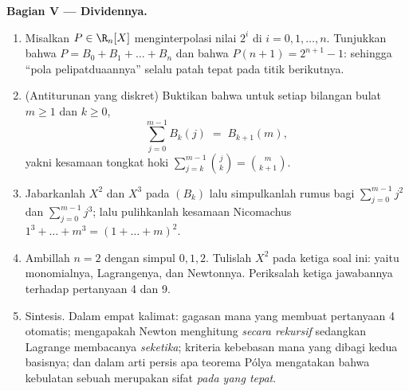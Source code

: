 \begin{problem}
\medskip
\noindent\textbf{Bagian V --- Dividennya.}
\begin{enumerate}[resume]
  \item Misalkan $P \in \R_n[X]$ menginterpolasi nilai $2^i$ di $i =
        0, 1, \dots, n$. Tunjukkan bahwa $P = B_0 + B_1 + \dots + B_n$
        dan bahwa $P(n + 1) = 2^{n+1} - 1$: sehingga ``pola
        pelipatduaannya'' selalu patah tepat pada titik berikutnya.
  \item (Antiturunan yang diskret) Buktikan bahwa untuk setiap bilangan bulat $m
        \geq 1$ dan $k \geq 0$,
        \[
        \sum_{j=0}^{m-1} B_k(j) \;=\; B_{k+1}(m),
        \]
        yakni kesamaan tongkat hoki $\sum_{j=k}^{m-1}
        \binom{j}{k} = \binom{m}{k+1}$.
  \item Jabarkanlah $X^2$ dan $X^3$ pada  $(B_k)$ lalu simpulkanlah
        rumus  bagi $\sum_{j=0}^{m-1} j^2$ dan
        $\sum_{j=0}^{m-1} j^3$; lalu pulihkanlah kesamaan Nicomachus
        $1^3 + \dots + m^3 = (1 + \dots + m)^2$.
  \item Ambillah $n = 2$ dengan simpul $0, 1, 2$. Tulislah 
        $X^2$ pada ketiga  soal ini: yaitu 
        monomialnya,  Lagrangenya, dan  Newtonnya. Periksalah ketiga
        jawabannya terhadap pertanyaan 4 dan 9.
  \item Sintesis. Dalam empat kalimat: gagasan  mana
        yang membuat pertanyaan 4 otomatis; mengapakah  Newton menghitung
         \emph{secara rekursif} sedangkan  Lagrange
        membacanya \emph{seketika}; kriteria kebebasan mana
        yang dibagi kedua basisnya; dan dalam arti persis apa teorema
        Pólya mengatakan bahwa kebulatan sebuah  merupakan
        sifat  \emph{pada  yang tepat}.

\end{enumerate}
\end{problem}
